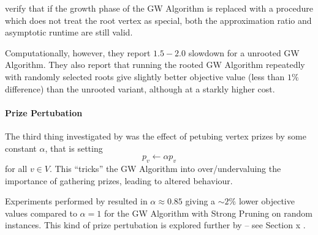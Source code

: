 \cite{Johnson:2000:PCS:338219.338637} verify that if the growth phase of the GW Algorithm
is replaced with a procedure which does not treat the root vertex as special, both the
approximation ratio and asymptotic runtime are still valid.

Computationally, however, they report $1.5-2.0$ slowdown for a unrooted GW Algorithm. They also
report that running the rooted GW Algorithm repeatedly with randomly selected roots give slightly
better objective value (less than $1\%$ difference) than the unrooted variant, although at a starkly
higher cost.
\paragraph{Prize Pertubation} The third thing investigated by \cite{Johnson:2000:PCS:338219.338637} was
the effect of petubing vertex prizes by some constant $\alpha$, that is setting
$$p_v \gets \alpha p_v$$
for all $v \in V$. This ``tricks'' the GW Algorithm into over/undervaluing the importance of gathering prizes,
 leading to altered behaviour.

 Experiments performed by \citeauthor{Johnson:2000:PCS:338219.338637} resulted in $\alpha \approx 0.85$ giving a $\sim 2\%$
 lower objective values compared to $\alpha = 1$ for the GW Algorithm with Strong Pruning on random instances.
  This kind of prize pertubation is explored further by \cite{canuto2001local} -- see Section x .
 



